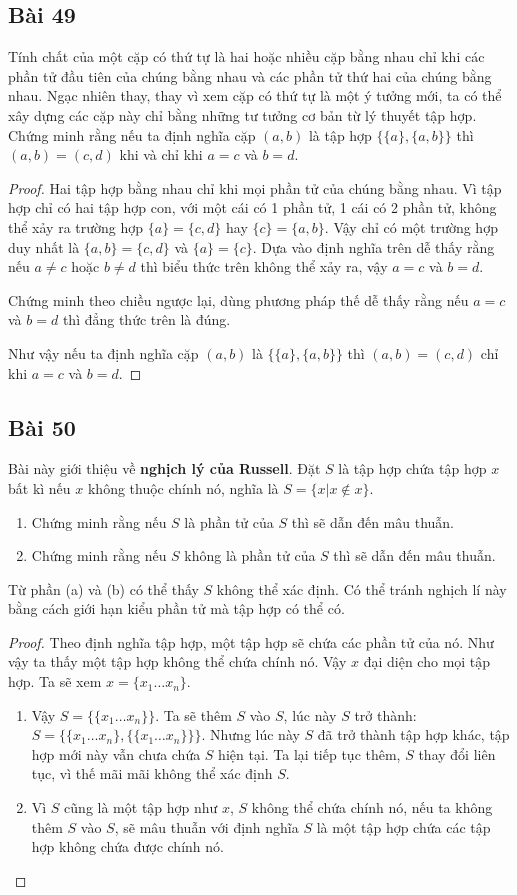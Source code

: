 \subsection*{Bài 49}
Tính chất của một cặp có thứ tự là hai hoặc nhiều cặp bằng nhau chỉ khi các phần tử đầu tiên của chúng bằng nhau và các phần tử thứ hai của chúng bằng nhau. Ngạc nhiên thay, thay vì xem cặp có thứ tự là một ý tưởng mới, ta có thể xây dựng các cặp này chỉ bằng những tư tưởng cơ bản từ lý thuyết tập hợp. Chứng minh rằng nếu ta định nghĩa cặp $(a,b)$ là tập hợp $\{\{a\},\{a,b\}\}$ thì $(a,b)=(c,d)$ khi và chỉ khi $a=c$ và $b=d$.
\begin{proof}
    Hai tập hợp bằng nhau chỉ khi mọi phần tử của chúng bằng nhau. Vì tập hợp chỉ có hai tập hợp con, với một cái có 1 phần tử, 1 cái có 2 phần tử, không thể xảy ra trường hợp $\{a\}=\{c,d\}$ hay $\{c\}=\{a,b\}$. Vậy chỉ có một trường hợp duy nhất là $\{a,b\}=\{c,d\}$ và $\{a\}=\{c\}$. Dựa vào định nghĩa trên dễ thấy rằng nếu $a\neq c$ hoặc $b\neq d$ thì biểu thức trên không thể xảy ra, vậy $a=c$ và $b=d$.

    Chứng minh theo chiều ngược lại, dùng phương pháp thế dễ thấy rằng nếu $a=c$ và $b=d$ thì đẳng thức trên là đúng.

    Như vậy nếu ta định nghĩa cặp $(a,b)$ là $\{\{a\},\{a,b\}\}$ thì $(a,b)=(c,d)$ chỉ khi $a=c$ và $b=d$.
\end{proof}
\subsection*{Bài 50}
Bài này giới thiệu về \textbf{nghịch lý của Russell}. Đặt $S$ là tập hợp chứa tập hợp $x$ bất kì nếu $x$ không thuộc chính nó, nghĩa là $S=\{x|x\notin x\}$.
\begin{enumerate}[label=\alph*)]
    \item Chứng minh rằng nếu $S$ là phần tử của $S$ thì sẽ dẫn đến mâu thuẫn.
    \item Chứng minh rằng nếu $S$ không là phần tử của $S$ thì sẽ dẫn đến mâu thuẫn.
\end{enumerate}
Từ phần (a) và (b) có thể thấy $S$ không thể xác định. Có thể tránh nghịch lí này bằng cách giới hạn kiểu phần tử mà tập hợp có thể có.
\begin{proof}
    Theo định nghĩa tập hợp, một tập hợp sẽ chứa các phần tử của nó. Như vậy ta thấy một tập hợp không thể chứa chính nó. Vậy $x$ đại diện cho mọi tập hợp. Ta sẽ xem $x=\{x_1\dots x_n\}$.
    \begin{enumerate}[label=\alph*)]
        \item Vậy $S=\{\{x_1\dots x_n\}\}$. Ta sẽ thêm $S$ vào $S$, lúc này $S$ trở thành: $S=\{\{x_1\dots x_n\},\{\{x_1\dots x_n\}\}\}$. Nhưng lúc này $S$ đã trở thành tập hợp khác, tập hợp mới này vẫn chưa chứa $S$ hiện tại. Ta lại tiếp tục thêm, $S$ thay đổi liên tục, vì thế mãi mãi không thể xác định $S$.
        \item Vì $S$ cũng là một tập hợp như $x$, $S$ không thể chứa chính nó, nếu ta không thêm $S$ vào $S$, sẽ mâu thuẫn với định nghĩa $S$ là một tập hợp chứa các tập hợp không chứa được chính nó.
    \end{enumerate}
\end{proof}
